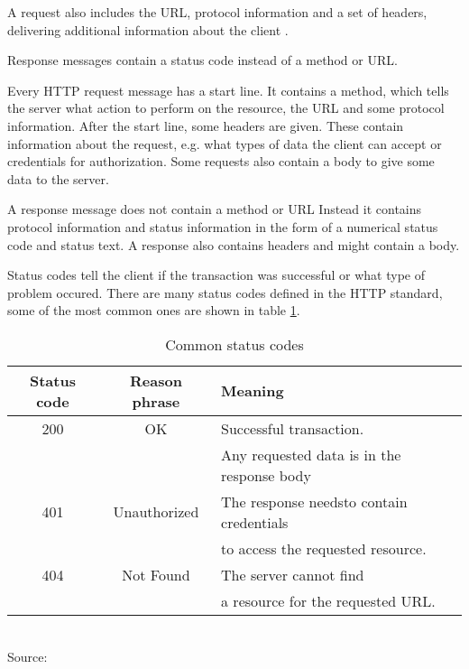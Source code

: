 A request also includes the URL, protocol information and a set of headers, delivering
additional information about the client \cite[47]{gourley2002http}.

Response messages contain a status code instead of a method or URL.


Every HTTP request message has a start line.
It contains a method, which tells the server what action to perform on the resource, the URL
and some protocol information.\cite[47]{gourley2002http}
After the start line, some headers are given. These contain information about the request,
e.g. what types of data the client can accept or credentials for authorization.
Some requests also contain a body to give some data to the server. \cite[52]{gourley2002http}

A response message does not contain a method or URL
Instead it contains protocol information and status information in the form of a numerical
status code and status text.\cite[48]{gourley2002http}
A response also contains headers and might contain a body.\cite[52]{gourley2002http}

Status codes tell the client if the transaction was successful or what type of problem occured\cite[49]{gourley2002http}.
There are many status codes defined in the HTTP standard,
some of the most common ones are shown in table \ref{tbl:Common status codes}.

\begin{table}[H]
    \centering
    \caption{Common status codes}
    \label{tbl:Common status codes}
    \begin{tabular}{ccl} 
        \toprule
        Status code & Reason phrase & Meaning \\ [0.5ex]
        \midrule
        200 & OK & Successful transaction.\\ & & Any requested data is in the response body \\ [1ex]
        401 & Unauthorized & The response needsto contain credentials\\ & & to access the requested resource. \\ [1ex]
        404 & Not Found & The server cannot find\\ & & a resource for the requested URL. \\ [1ex]
        \bottomrule
    \end{tabular}
\\Source: \cite[50]{gourley2002http}
\end{table}



